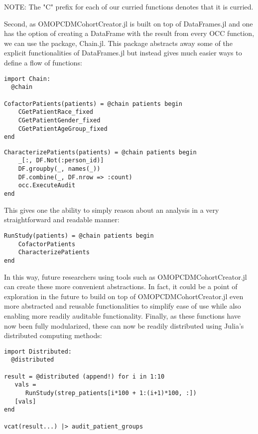 \documentclass{juliacon}
\begin{document}
NOTE: The "C" prefix for each of our curried functions denotes that it is curried.

Second, as OMOPCDMCohortCreator.jl is built on top of DataFrames.jl and one has the option of creating a DataFrame with the result from every OCC function, we can use the package, Chain.jl.
This package abstracts away some of the explicit functionalities of DataFrames.jl but instead gives much easier ways to define a flow of functions:

\begin{verbatim}
import Chain:
  @chain

CofactorPatients(patients) = @chain patients begin
    CGetPatientRace_fixed
    CGetPatientGender_fixed
    CGetPatientAgeGroup_fixed
end
\end{verbatim}

\begin{verbatim}
CharacterizePatients(patients) = @chain patients begin
    _[:, DF.Not(:person_id)]
    DF.groupby(_, names(_))
    DF.combine(_, DF.nrow => :count)
    occ.ExecuteAudit
end
\end{verbatim}

This gives one the ability to simply reason about an analysis in a very straightforward and readable manner:

\begin{verbatim}
RunStudy(patients) = @chain patients begin
    CofactorPatients
    CharacterizePatients
end
\end{verbatim}

In this way, future researchers using tools such as OMOPCDMCohortCreator.jl can create these more convenient abstractions.
In fact, it could be a point of exploration in the future to build on top of OMOPCDMCohortCreator.jl even more abstracted and reusable functionalities to simplify ease of use while also enabling more readily auditable functionality.
Finally, as these functions have now been fully modularized, these can now be readily distributed using Julia's distributed computing methods:

\begin{verbatim}
import Distributed:
  @distributed 

result = @distributed (append!) for i in 1:10
   vals = 
      RunStudy(strep_patients[i*100 + 1:(i+1)*100, :])
   [vals]
end

vcat(result...) |> audit_patient_groups
\end{verbatim}
\end{document}
